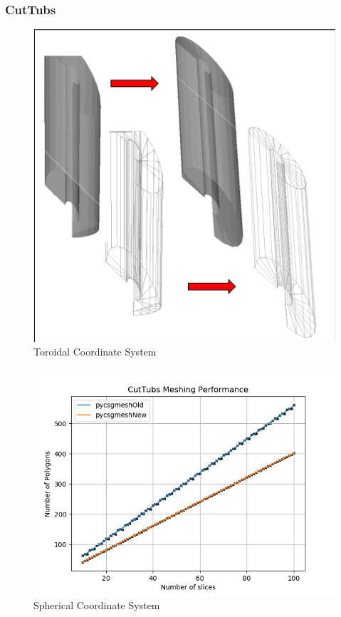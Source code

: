 \documentclass[12pt,a4paper]{article}
\begin{document}
\subsubsection{CutTubs}

\begin{figure}[h!]
\centering
\includegraphics[scale=0.5]{Images//Meshes//CutTubs.png}
\caption[width=\columnwidth]{Toroidal Coordinate System}
\label{conts}
\end{figure}

\begin{figure}[h!]
\centering
\includegraphics[scale=0.5]{Images//Quad_fits//CutTubs_quad.png}
\caption[width=\columnwidth]{Spherical Coordinate System}
\label{conts}
\end{figure}
\end{document}
